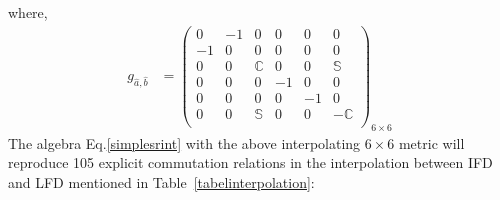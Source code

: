\documentclass[%
 reprint,
superscriptaddress,
 amsmath,amssymb,
 aps,
]{revtex4-2}
\begin{document}
where, 
\begin{align}
    g_{\hat{a},\hat{b}}&=\begin{pmatrix}
  0&-1&0&0&0&0\\
  -1&0&0&0&0&0\\
  0&0&\mathbb{C}&0&0&\mathbb{S}\\
  0&0&0&-1&0&0\\
  0&0&0&0&-1&0\\
  0&0&\mathbb{S}&0&0&-\mathbb{C}\\
  \end{pmatrix}_{6\times6}\label{metricghat}
\end{align}
The algebra Eq.\eqref{simplesrint} with the above interpolating $6\times6$ metric will reproduce 105 explicit commutation relations in the interpolation between IFD and LFD mentioned in Table~\ref{tabelinterpolation}:
\end{document}
